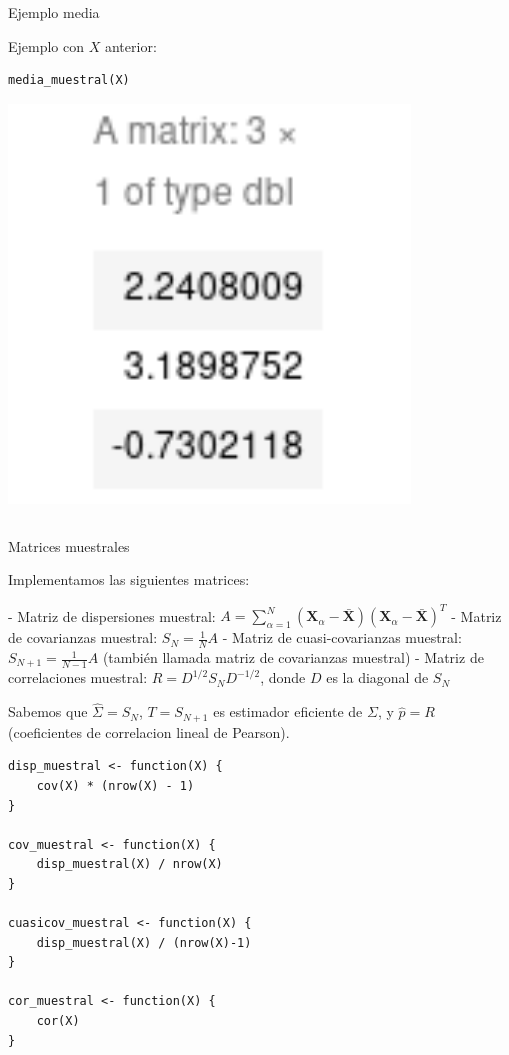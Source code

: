 \documentclass[xcolor=table]{beamer}
\begin{document}
\begin{frame}[fragile]{Ejemplo media}

Ejemplo con $X$ anterior:

\begin{lstlisting}
media_muestral(X)
\end{lstlisting}

\includegraphics[width=0.8\textwidth]{media_muestral.png}

\begin{lstlisting}

\end{lstlisting}

\end{frame}

\begin{frame}[fragile]{Matrices muestrales}

Implementamos las siguientes matrices:

- Matriz de dispersiones muestral: $A = \sum^N_{\alpha = 1} (\pmb{X}_\alpha - \pmb{\bar{X}})(\pmb{X}_\alpha - \pmb{\bar{X}})^T$
- Matriz de covarianzas muestral: $S_N = \frac{1}{N} A$
- Matriz de cuasi-covarianzas muestral: $S_{N+1} = \frac{1}{N-1} A $ (también llamada matriz de covarianzas muestral)
- Matriz de correlaciones muestral: $R = D^{1/2}S_N D^{-1/2}$, donde $D$ es la diagonal de $S_N$

Sabemos que $\hat{\Sigma} = S_N$, $T = S_{N+1}$ es estimador eficiente de $\Sigma$, y $\hat{p} = R$ (coeficientes de correlacion lineal de Pearson).

\begin{lstlisting}
disp_muestral <- function(X) {
    cov(X) * (nrow(X) - 1)
}

cov_muestral <- function(X) {
    disp_muestral(X) / nrow(X)
}

cuasicov_muestral <- function(X) {
    disp_muestral(X) / (nrow(X)-1)
}

cor_muestral <- function(X) {
    cor(X)
}
\end{lstlisting}

\end{frame}
\end{document}
